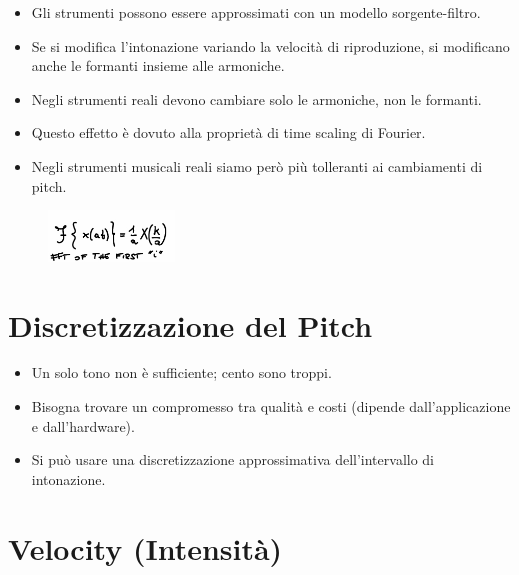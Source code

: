 \begin{itemize}
    \item Gli strumenti possono essere approssimati con un modello sorgente-filtro.
    \item Se si modifica l'intonazione variando la velocità di riproduzione, si modificano anche le formanti insieme alle armoniche.
    \item Negli strumenti reali devono cambiare solo le armoniche, non le formanti.
    \item Questo effetto è dovuto alla proprietà di time scaling di Fourier.
    \item Negli strumenti musicali reali siamo però più tolleranti ai cambiamenti di pitch.
\end{itemize}
\begin{figure}[H]
    \centering
    \includegraphics[width=0.3\textwidth]{capitoli/capitolo13/immagini/image3.jpeg}
\end{figure}

\section{Discretizzazione del Pitch}

\begin{itemize}
    \item Un solo tono non è sufficiente; cento sono troppi.
    \item Bisogna trovare un compromesso tra qualità e costi (dipende dall'applicazione e dall’hardware).
    \item Si può usare una discretizzazione approssimativa dell’intervallo di intonazione.
\end{itemize}

\section{Velocity (Intensità)}

